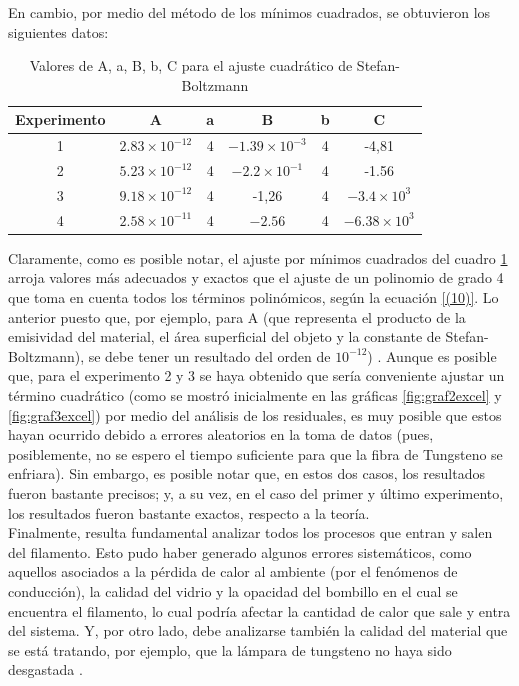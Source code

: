 \documentclass[%
 reprint,
 amsmath,amssymb,
 aps,
]{revtex4-1}
\begin{document}
En cambio, por medio del método de los mínimos cuadrados, se obtuvieron los siguientes datos:

\begin{table}[H]
  \centering
  \caption{Valores de A, a, B, b, C para el ajuste cuadrático de Stefan-Boltzmann}
    \begin{tabular}{|c|c|c|c|c|c|}
    \hline
    Experimento & A     & a     & B     & b & C \\
    \hline
    1     & $2.83 \times 10^{-12}$ & 4     & $-1.39 \times 10^{-3}$ & 4 & -4,81 \\
    \hline
    2     & $5.23 \times 10^{-12}$ & 4     & $-2.2 \times 10^{-1}$ & 4 & -1.56 \\
    \hline
    3     & $9.18 \times 10^{-12}$ & 4     & -1,26 & 4 & $-3.4 \times 10^{3}$ \\
    \hline
    4     & $2.58 \times 10^{-11}$ & 4     & $-2.56$ & 4 & $-6.38 \times 10^{3}$\\
    \hline
    \end{tabular}%
  \label{tab:cuadro}%
\end{table}%

Claramente, como es posible notar, el ajuste por mínimos cuadrados del cuadro \ref{tab:cuadro} arroja valores más adecuados y exactos que el ajuste de un polinomio de grado 4 que toma en cuenta todos los términos polinómicos, según la ecuación \ref{(10)}. Lo anterior puesto que, por ejemplo, para A (que representa el producto de la emisividad del material, el área superficial del objeto y la constante de Stefan-Boltzmann), se debe tener un resultado del orden de $10^{-12}$) \cite{electric}. Aunque es posible que, para el experimento 2 y 3 se haya obtenido que sería conveniente ajustar un término cuadrático (como se mostró inicialmente en las gráficas \ref{fig:graf2excel} y \ref{fig:graf3excel}) por medio del análisis de los residuales, es muy posible que estos hayan ocurrido debido a errores aleatorios en la toma de datos (pues, posiblemente, no se espero el tiempo suficiente para que la fibra de Tungsteno se enfriara). Sin embargo, es posible notar que, en estos dos casos, los resultados fueron bastante precisos; y, a su vez, en el caso del primer y último experimento, los resultados fueron bastante exactos, respecto a la teoría. \\

Finalmente, resulta fundamental analizar todos los procesos que entran y salen del filamento. Esto pudo haber generado algunos errores sistemáticos, como aquellos asociados a la pérdida de calor al ambiente (por el fenómenos de conducción), la calidad del vidrio y la opacidad del bombillo en el cual se encuentra el filamento, lo cual podría afectar la cantidad de calor que sale y entra del sistema. Y, por otro lado, debe analizarse también la calidad del material que se está tratando, por ejemplo, que la lámpara de tungsteno no haya sido desgastada \cite{malampara}.
\end{document}
